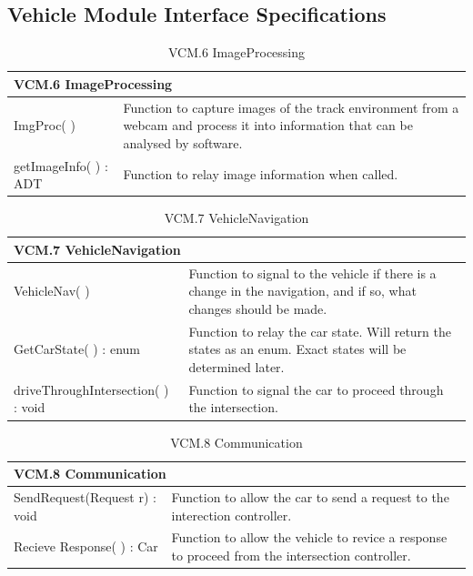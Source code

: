 \documentclass [10pt]{article}
\begin{document}
\subsection{Vehicle Module Interface Specifications}
\begin{longtable}{| p{ } | p{ } | }\caption{VCM.6 ImageProcessing} \\\hline  
 \multicolumn{2}{|l|}{\textbf {VCM.6 ImageProcessing}}\\ \hline
\cellcolor{tableCell}ImgProc( ) & \cellcolor{tableCell}Function to capture images of the track environment from a webcam and process it into information that can be analysed by software.  \\ \hline 

getImageInfo( ) : ADT & Function to relay image information when called.  \\ \hline 


\end{longtable}

\begin{longtable}{| p{ } | p{ } | }\caption{VCM.7 VehicleNavigation} \\\hline  
 \multicolumn{2}{|l|}{\textbf {VCM.7 VehicleNavigation}}\\ \hline
\cellcolor{tableCell}VehicleNav( ) & \cellcolor{tableCell}Function to signal to the vehicle if there is a change in the navigation, and if so, what changes should be made. \\ \hline 

GetCarState( ) : enum &Function to relay the car state. Will return the states as an enum. Exact states will be determined later. \\ \hline 

\cellcolor{tableCell}driveThroughIntersection( ) : void & \cellcolor{tableCell}Function to signal the car to proceed through the intersection. 
\\ \hline

\end{longtable}

\begin{longtable}{| p{ } | p{ } | }\caption{VCM.8 Communication} \\\hline  
 \multicolumn{2}{|l|}{\textbf {VCM.8 Communication}}\\ \hline
\cellcolor{tableCell}SendRequest(Request r) : void & \cellcolor{tableCell}Function to allow the car to send a request to the interection controller. \\ \hline 

Recieve Response( ) : Car &Function to allow the vehicle to revice a response to proceed from the intersection controller. \\ \hline 

\end{longtable}
\end{document}
